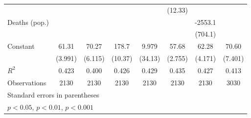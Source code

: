 \documentclass{article}
\begin{document}
{\begin{longtable}{l*{7}{c}}
                &                  &                  &                  &                  &  (12.33)         &                  &                  \\
Deaths (pop.)   &                  &                  &                  &                  &                  &  -2553.1\sym{**} &                  \\
                &                  &                  &                  &                  &                  &  (704.1)         &                  \\
Constant        &    61.31\sym{***}&    70.27\sym{***}&    178.7\sym{***}&    9.979         &    57.68\sym{***}&    62.28\sym{***}&    70.60\sym{***}\\
                &  (3.991)         &  (6.115)         &  (10.37)         &  (34.13)         &  (2.755)         &  (4.171)         &  (7.401)         \\
\hline
\(R^{2}\)       &    0.423         &    0.400         &    0.426         &    0.429         &    0.435         &    0.427         &    0.413         \\
Observations    &     2130         &     2130         &     2130         &     2130         &     2130         &     2130         &     3030         \\
\hline\hline
\multicolumn{8}{l}{\footnotesize Standard errors in parentheses}\\
\multicolumn{8}{l}{\footnotesize \sym{*} \(p<0.05\), \sym{**} \(p<0.01\), \sym{***} \(p<0.001\)}\\
\end{longtable}
}
\end{document}
